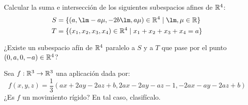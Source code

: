 \documentclass[12pt]{article}
\begin{document}
    \begin{ejercicio}
        Calcular la suma e intersección de los siguientes subespacios afines de $\mathbb{R}^4$:
        \begin{align*}
            S &= \{(a, \lm-a\mu, -2b\lm, a\mu)\in \bb{R}^4 \mid \lm,\mu\in \bb{R}\}\\
            T &= \{(x_1,x_2,x_3,x_4)\in \bb{R}^4 \mid x_1+x_2+x_3+x_4=a\}
        \end{align*}

        ¿Existe un subespacio afín de $\mathbb{R}^4$ paralelo a $S$ y a $T$ que pase por el punto $(0,a,0,-a)\in \mathbb{R}^4$?
    \end{ejercicio}


    \begin{ejercicio}
        Sea $f:\mathbb{R}^3 \to \mathbb{R}^3$ una aplicación dada por:
        \begin{equation*}
            f(x,y,z) = \frac{1}{3}\left(ax +2ay-2az+b, 2ax -2ay-az-1, -2ax-ay-2az+b\right)
        \end{equation*}
        ¿Es $f$ un movimiento rígido? En tal caso, clasifícalo.
    \end{ejercicio}
     
\end{document}
